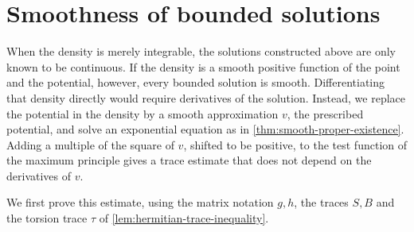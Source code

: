 \section{Smoothness of bounded solutions}
\label{sec:bounded-hermitian-smoothness}

When the density is merely integrable, the solutions constructed above are only known to be continuous. If the density is a smooth positive function of the point and the potential, however, every bounded solution is smooth. Differentiating that density directly would require derivatives of the solution. Instead, we replace the potential in the density by a smooth approximation $v$, the prescribed potential, and solve an exponential equation as in \cref{thm:smooth-proper-existence}. Adding a multiple of the square of $v$, shifted to be positive, to the test function of the maximum principle gives a trace estimate that does not depend on the derivatives of $v$.

We first prove this estimate, using the matrix notation $g,h$, the traces $S,B$ and the torsion trace $\tau$ of \cref{lem:hermitian-trace-inequality}.


